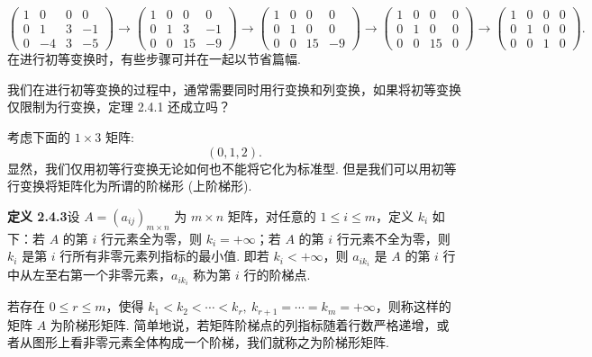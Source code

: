 \documentclass[UTF8,12pt,a4paper,fontset=fandol]{ctexart}
\begin{document}
\[
\left(\begin{array}{cccc}
1 & 0 & 0 & 0\\
0 & 1 & 3 & -1\\
0 & -4 & 3 & -5
\end{array}\right)
\longrightarrow
\left(\begin{array}{cccc}
1 & 0 & 0 & 0\\
0 & 1 & 3 & -1\\
0 & 0 & 15 & -9
\end{array}\right)
\longrightarrow
\left(\begin{array}{cccc}
1 & 0 & 0 & 0\\
0 & 1 & 0 & 0\\
0 & 0 & 15 & -9
\end{array}\right)
\longrightarrow
\left(\begin{array}{cccc}
1 & 0 & 0 & 0\\
0 & 1 & 0 & 0\\
0 & 0 & 15 & 0
\end{array}\right)
\longrightarrow
\left(\begin{array}{cccc}
1 & 0 & 0 & 0\\
0 & 1 & 0 & 0\\
0 & 0 & 1 & 0
\end{array}\right).
\]
在进行初等变换时，有些步骤可并在一起以节省篇幅.

我们在进行初等变换的过程中，通常需要同时用行变换和列变换，如果将初等变换仅限制为行变换，定理 2.4.1 还成立吗？

考虑下面的 $1\times 3$ 矩阵:
\[
(0,1,2).
\]
显然，我们仅用初等行变换无论如何也不能将它化为标准型. 但是我们可以用初等行变换将矩阵化为所谓的阶梯形 (上阶梯形).

\noindent\textbf{定义 2.4.3}\quad 设 $A=(a_{ij})_{m\times n}$ 为 $m\times n$ 矩阵，对任意的 $1\le i\le m$，定义 $k_i$ 如下：若 $A$ 的第 $i$ 行元素全为零，则 $k_i=+\infty$；若 $A$ 的第 $i$ 行元素不全为零，则 $k_i$ 是第 $i$ 行所有非零元素列指标的最小值. 即若 $k_i<+\infty$，则 $a_{ik_i}$ 是 $A$ 的第 $i$ 行中从左至右第一个非零元素，$a_{ik_i}$ 称为第 $i$ 行的阶梯点.

若存在 $0\le r\le m$，使得 $k_1<k_2<\cdots<k_r,\ k_{r+1}=\cdots=k_m=+\infty$，则称这样的矩阵 $A$ 为阶梯形矩阵. 简单地说，若矩阵阶梯点的列指标随着行数严格递增，或者从图形上看非零元素全体构成一个阶梯，我们就称之为阶梯形矩阵.
\end{document}
